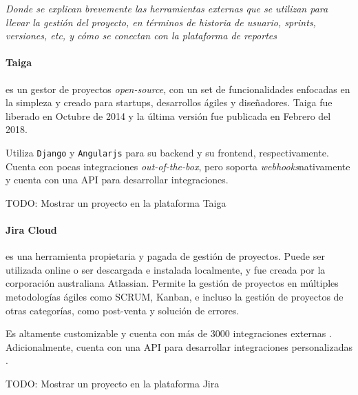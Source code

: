 \textit{Donde se explican brevemente las herramientas externas que se utilizan para llevar
la gestión del proyecto, en términos de historia de usuario, sprints, versiones, etc, y cómo se conectan con la plataforma de reportes}


\paragraph{Taiga} es un gestor de proyectos \textit{open-source}, con un set de funcionalidades
enfocadas en la simpleza y creado para startups, desarrollos ágiles y diseñadores.
Taiga fue liberado en Octubre de 2014 y la última versión fue publicada en Febrero del 2018.

Utiliza \verb|Django| y \verb|Angularjs| para su backend y su frontend, respectivamente.
Cuenta con pocas integraciones \textit{out-of-the-box}, pero soporta
\textit{webhooks}\footnotemark[7] nativamente y cuenta con una API para desarrollar 
integraciones\cite{taiga_webhooks}\cite{taiga_api}.

TODO: Mostrar un proyecto en la plataforma Taiga


\paragraph{Jira Cloud} es una herramienta propietaria y pagada de gestión de proyectos. 
Puede ser utilizada online o ser descargada e instalada localmente, y fue creada
por la corporación australiana Atlassian. Permite la gestión de proyectos en múltiples metodologías
ágiles como SCRUM, Kanban, e incluso la gestión de proyectos de otras categorías, como post-venta y
solución de errores. 

Es altamente customizable y cuenta con más de 3000 integraciones
externas \cite{jira_features}. Adicionalmente, cuenta con una API para desarrollar integraciones
personalizadas \cite{jira_api}.

TODO: Mostrar un proyecto en la plataforma Jira